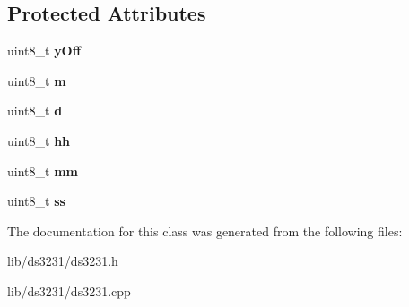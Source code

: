 \subsection*{Protected Attributes}
\begin{DoxyCompactItemize}
\item 
\mbox{\label{class_date_time_ac0b5906cbb32751988603bf0388e7ab9}} 
uint8\+\_\+t {\bfseries y\+Off}
\item 
\mbox{\label{class_date_time_a04c79ec05511462bc6a015e5b1088609}} 
uint8\+\_\+t {\bfseries m}
\item 
\mbox{\label{class_date_time_abad2ae4520c8a7f87fd242c0d9a53256}} 
uint8\+\_\+t {\bfseries d}
\item 
\mbox{\label{class_date_time_ad65c31b7b4bf0430311e5bdf3f343371}} 
uint8\+\_\+t {\bfseries hh}
\item 
\mbox{\label{class_date_time_af2cbffff9349832135c3280a18d21510}} 
uint8\+\_\+t {\bfseries mm}
\item 
\mbox{\label{class_date_time_a38da3481e6355fcf8ceb4c57eb9db0ce}} 
uint8\+\_\+t {\bfseries ss}
\end{DoxyCompactItemize}


The documentation for this class was generated from the following files\+:\begin{DoxyCompactItemize}
\item 
lib/ds3231/ds3231.\+h\item 
lib/ds3231/ds3231.\+cpp\end{DoxyCompactItemize}
